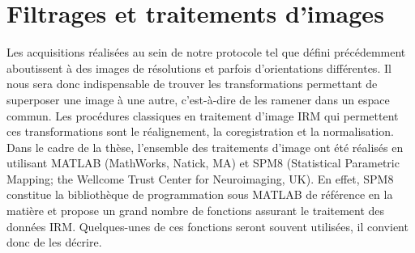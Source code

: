 \section{Filtrages et traitements d’images}
Les acquisitions réalisées au sein de notre protocole tel que défini précédemment aboutissent
à des images de résolutions et parfois d’orientations différentes. Il nous sera donc indispensable de
trouver les transformations permettant de superposer une image à une autre, c’est-à-dire de les
ramener dans un espace commun. Les procédures classiques en traitement d’image IRM qui
permettent ces transformations sont le réalignement, la coregistration et la normalisation.\\
Dans le cadre de la thèse, l’ensemble des traitements d’image ont été réalisés en utilisant
MATLAB (MathWorks, Natick, MA) et SPM8 (Statistical Parametric Mapping; the Wellcome Trust
Center for Neuroimaging, UK). En effet, SPM8 constitue la bibliothèque de programmation sous
MATLAB de référence en la matière et propose un grand nombre de fonctions assurant le traitement
des données IRM. Quelques-unes de ces fonctions seront souvent utilisées, il convient donc de les
décrire.
